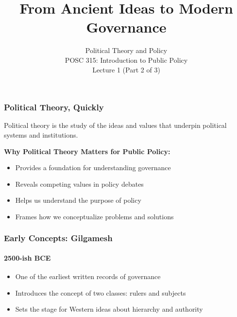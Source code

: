\documentclass[10pt]{beamer}
\begin{document}
\title{From Ancient Ideas to Modern Governance}
\subtitle{Political Theory and Policy\\POSC 315: Introduction to Public Policy\\Lecture 1 (Part 2 of 3)}
\date{}

\maketitle

\begin{frame}
\frametitle{Political Theory, Quickly}

\begin{block}{}
\centering
Political theory is the study of the ideas and values that underpin political systems and institutions.
\end{block}

\pause
\vspace{0.5cm}
\textbf{Why Political Theory Matters for Public Policy:}
\begin{itemize}
\item Provides a foundation for understanding governance
\item Reveals competing values in policy debates
\item Helps us understand the purpose of policy
\item Frames how we conceptualize problems and solutions
\end{itemize}

\end{frame}

\begin{frame}
\frametitle{Early Concepts: Gilgamesh}
\framesubtitle{2500-ish BCE}

\begin{itemize}
\item<1-> One of the earliest written records of governance
\item<2-> Introduces the concept of two classes: rulers and subjects
\item<3-> Sets the stage for Western ideas about hierarchy and authority
\end{itemize}

\end{frame}
\end{document}
